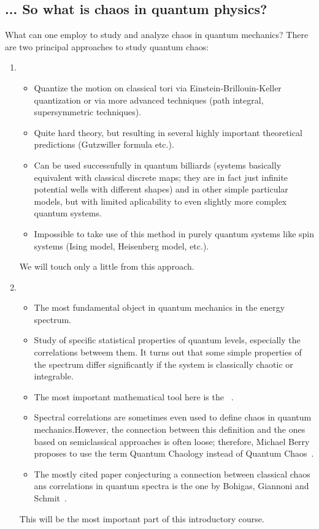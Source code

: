 \documentclass[a4paper,11pt,twoside]{article}
\begin{document}
    \subsection{... So what is chaos in quantum physics?}
        What can one employ to study and analyze chaos in quantum mechanics?
        There are two principal approaches to study quantum chaos:
        \begin{enumerate}
            \item {}
                \begin{itemize}
                    \item Quantize the motion on classical tori via Einstein-Brillouin-Keller quantization or via more advanced techniques (path integral, supersymmetric techniques).
                    \item Quite hard theory, but resulting in several highly important theoretical predictions (Gutzwiller formula etc.).
                    \item Can be used successufully in quantum billiards (systems basically equivalent with classical discrete maps; they are in fact just infinite potential wells with different shapes) and in other simple particular models, but with limited aplicability to even slightly more complex quantum systems.
                    \item Impossible to take use of this method in purely quantum systems like spin systems (Ising model, Heisenberg model, etc.).
                \end{itemize}
                We will touch only a little from this approach.

                \item {}
                    \begin{itemize}
                        \item The most fundamental object in quantum mechanics in the energy spectrum.
                        \item Study of specific statistical properties of quantum levels, especially the correlations betweem them.
                        It turns out that some simple properties of the spectrum differ significantly if the system is classically chaotic or integrable.
                        \item The most important mathematical tool here is the ~\cite{Meh04}.
                        \item Spectral correlations are sometimes even used to define chaos in quantum mechanics.How\-ever, the connection between this definition and the ones based on semiclassical approaches is often loose; therefore, Michael Berry proposes to use the term Quantum Chaology instead of Quantum Chaos~\cite{Ber89}.
                        \item The mostly cited paper conjecturing a connection between classical chaos ans correlations in quantum spectra is the one by Bohigas, Giannoni and Schmit~\cite{Boh84}.
                    \end{itemize}
                    This will be the most important part of this introductory course.
        \end{enumerate}
\end{document}
